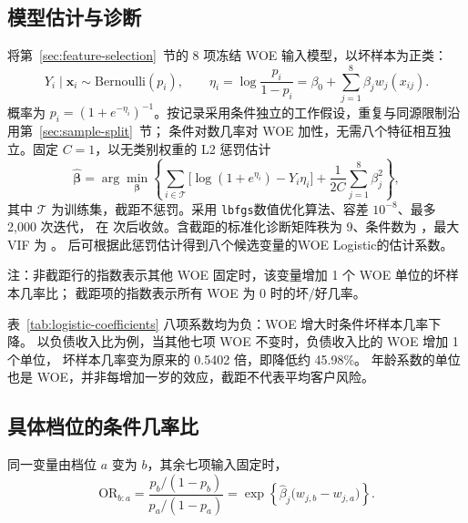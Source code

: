 
\begingroup
\setlength{\intextsep}{7pt}
\setlength{\textfloatsep}{10pt}

\subsection{模型估计与诊断}
将第~\ref{sec:feature-selection}~节的 8 项冻结 WOE 输入模型，以坏样本为正类：
\begin{equation}
  Y_i\mid\boldsymbol{x}_i\sim\mathrm{Bernoulli}(p_i),\qquad
  \eta_i=\log\frac{p_i}{1-p_i}=\beta_0+\sum_{j=1}^{8}\beta_jw_j(x_{ij}).
  \label{eq:woe-logistic}
\end{equation}
概率为 $p_i=(1+e^{-\eta_i})^{-1}$。按记录采用条件独立的工作假设，重复与同源限制沿用第~\ref{sec:sample-split}~节；
条件对数几率对 WOE 加性，无需八个特征相互独立。固定 $C=1$，以无类别权重的 L2 惩罚估计
\begin{equation}
  \widehat{\boldsymbol\beta}
  =\arg\min_{\boldsymbol\beta}\left\{
    \sum_{i\in\mathcal T}\bigl[\log(1+e^{\eta_i})-Y_i\eta_i\bigr]
    +\frac{1}{2C}\sum_{j=1}^{8}\beta_j^2\right\},
  \label{eq:penalized-logistic}
\end{equation}
其中 $\mathcal T$ 为训练集，截距不惩罚。采用 \texttt{lbfgs}数值优化算法、容差 $10^{-8}$、最多 2,000 次迭代，
在 \LogitWoeIterations{} 次后收敛。含截距的标准化诊断矩阵秩为 9、条件数为 \LogitCondition，最大 VIF 为 \LogitMaxVIF。
后可根据此惩罚估计得到八个候选变量的WOE Logistic的估计系数。

\begin{table}[!htbp]
  \centering
  \caption{八变量 WOE Logistic 的估计系数}
  \label{tab:logistic-coefficients}
  \footnotesize
  \setlength{\tabcolsep}{8pt}
  \renewcommand{\arraystretch}{1.02}
  
  \begin{minipage}{\linewidth}
    \footnotesize
    注：非截距行的指数表示其他 WOE 固定时，该变量增加 1 个 WOE 单位的坏样本几率比；
    截距项的指数表示所有 WOE 为 0 时的坏/好几率。
  \end{minipage}
\end{table}

表~\ref{tab:logistic-coefficients} 八项系数均为负：WOE 增大时条件坏样本几率下降。
以负债收入比为例，当其他七项 WOE 不变时，负债收入比的 WOE 增加 1 个单位，
坏样本几率变为原来的 0.5402 倍，即降低约 45.98\%。
年龄系数的单位也是 WOE，并非每增加一岁的效应，截距不代表平均客户风险。

\subsection{具体档位的条件几率比}
同一变量由档位 $a$ 变为 $b$，其余七项输入固定时，
\begin{equation}
  \mathrm{OR}_{b:a}
  =\frac{p_b/(1-p_b)}{p_a/(1-p_a)}
  =\exp\!\left\{\widehat\beta_j\bigl(w_{j,b}-w_{j,a}\bigr)\right\}.
  \label{eq:conditional-bin-odds-ratio}
\end{equation}

